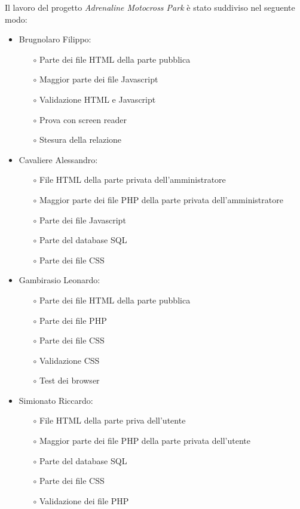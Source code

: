 Il lavoro del progetto \textit{Adrenaline Motocross Park} è stato suddiviso nel seguente modo:
\begin{itemize}
    \item Brugnolaro Filippo:
        \begin{itemize}
            \item[$\circ$] Parte dei file HTML della parte pubblica
            \item[$\circ$] Maggior parte dei file Javascript
            \item[$\circ$] Validazione HTML e Javascript
            \item[$\circ$] Prova con screen reader
            \item[$\circ$] Stesura della relazione
        \end{itemize}
    \item Cavaliere Alessandro:
        \begin{itemize}
            \item[$\circ$] File HTML della parte privata dell'amministratore
            \item[$\circ$] Maggior parte dei file PHP della parte privata dell'amministratore
            \item[$\circ$] Parte dei file Javascript
            \item[$\circ$] Parte del database SQL
            \item[$\circ$] Parte dei file CSS
        \end{itemize}
    \item Gambirasio Leonardo:
        \begin{itemize}
            \item[$\circ$] Parte dei file HTML della parte pubblica
            \item[$\circ$] Parte dei file PHP
            \item[$\circ$] Parte dei file CSS
            \item[$\circ$] Validazione CSS
            \item[$\circ$] Test dei browser
        \end{itemize}
    \item Simionato Riccardo:
        \begin{itemize}
            \item[$\circ$] File HTML della parte priva dell'utente
            \item[$\circ$] Maggior parte dei file PHP della parte privata dell'utente
            \item[$\circ$] Parte del database SQL
            \item[$\circ$] Parte dei file CSS
            \item[$\circ$] Validazione dei file PHP
        \end{itemize}
\end{itemize}
